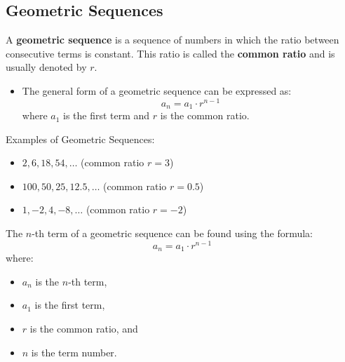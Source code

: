 \subsection{Geometric Sequences}
A \textbf{geometric sequence} is a sequence of numbers in which the ratio between consecutive terms is constant. This ratio is called the \textbf{common ratio} and is usually denoted by \(r\).
\begin{itemize}
    \item The general form of a geometric sequence can be expressed as:
    \[ a_n = a_1 \cdot r^{n-1} \]
    where \(a_1\) is the first term and \(r\) is the common ratio.
\end{itemize}
Examples of Geometric Sequences:
\begin{itemize}
    \item \(2, 6, 18, 54, \ldots\) (common ratio \(r = 3\))
    \item \(100, 50, 25, 12.5, \ldots\) (common ratio \(r = 0.5\))
    \item \(1, -2, 4, -8, \ldots\) (common ratio \(r = -2\))
\end{itemize}
The \(n\)-th term of a geometric sequence can be found using the formula:
\[ a_n = a_1 \cdot r^{n-1} \]
where:
\begin{itemize}
    \item \(a_n\) is the \(n\)-th term,
    \item \(a_1\) is the first term,
    \item \(r\) is the common ratio, and
    \item \(n\) is the term number.
\end{itemize}

